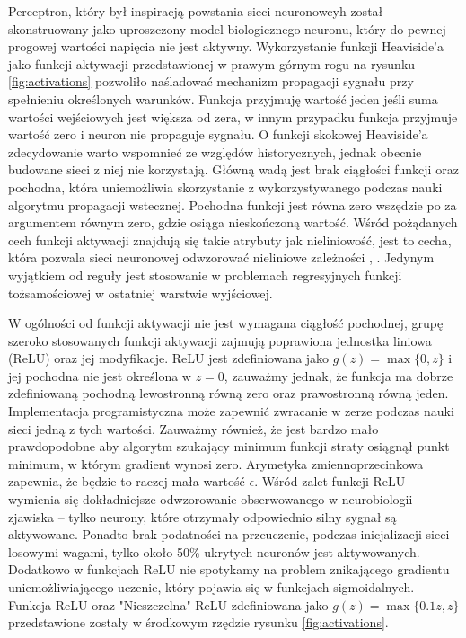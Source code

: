 \documentclass[11pt]{book}
\theoremstyle{definition}
\begin{document}
Perceptron, który był inspiracją powstania sieci neuronowcyh został skonstruowany jako uproszczony model biologicznego neuronu, który do pewnej progowej wartości napięcia nie jest aktywny. Wykorzystanie funkcji Heaviside'a jako funkcji aktywacji przedstawionej w prawym górnym rogu na rysunku \ref{fig:activations} pozwoliło naśladować mechanizm propagacji sygnału przy spełnieniu określonych warunków. Funkcja przyjmuję wartość jeden jeśli suma wartości wejściowych jest większa od zera, w innym przypadku funkcja przyjmuje wartość zero i neuron nie propaguje sygnału. O funkcji skokowej Heaviside'a zdecydowanie warto wspomnieć ze względów historycznych, jednak obecnie budowane sieci z niej nie korzystają. Główną wadą jest brak ciągłości funkcji oraz pochodna, która uniemożliwia skorzystanie z wykorzystywanego podczas nauki algorytmu propagacji wstecznej\cite{1986Natur.323..533R}. Pochodna funkcji jest równa zero wszędzie po za argumentem równym zero, gdzie osiąga nieskończoną wartość. Wśród pożądanych cech funkcji aktywacji znajdują się takie atrybuty jak nieliniowość, jest to cecha, która pozwala sieci neuronowej odwzorować nieliniowe zależności \cite{LeCun:1998:EB:645754.668382}, \cite{Hornik1989}. Jedynym wyjątkiem od reguły jest stosowanie w problemach regresyjnych funkcji tożsamościowej w ostatniej warstwie wyjściowej. 


W ogólności od funkcji aktywacji nie jest wymagana ciągłość pochodnej, grupę szeroko stosowanych funkcji aktywacji zajmują poprawiona jednostka liniowa (ReLU) oraz jej modyfikacje. ReLU jest zdefiniowana jako $g(z) = \max \{0, z\}$ i jej pochodna nie jest określona w $z = 0$, zauważmy jednak, że funkcja ma dobrze zdefiniowaną pochodną lewostronną równą zero oraz prawostronną równą jeden. Implementacja programistyczna może zapewnić zwracanie w zerze podczas nauki sieci jedną z tych wartości. Zauważmy również, że jest bardzo mało prawdopodobne aby algorytm szukający minimum funkcji straty osiągnął punkt minimum, w którym gradient wynosi zero. Arymetyka zmiennoprzecinkowa zapewnia, że będzie to raczej mała wartość $\epsilon$. Wśród zalet funkcji ReLU wymienia się dokładniejsze odwzorowanie obserwowanego w neurobiologii zjawiska -- tylko neurony, które otrzymały odpowiednio silny sygnał są aktywowane. Ponadto brak podatności na przeuczenie, podczas inicjalizacji sieci losowymi wagami, tylko około 50\% ukrytych neuronów jest aktywowanych. Dodatkowo w funkcjach ReLU nie spotykamy na problem znikającego gradientu uniemożliwiającego uczenie, który pojawia się w funkcjach sigmoidalnych. Funkcja ReLU oraz "Nieszczelna" ReLU zdefiniowana jako $g(z) = \max \{0.1 z, z\}$ przedstawione zostały w środkowym rzędzie rysunku \ref{fig:activations}. 
\end{document}
